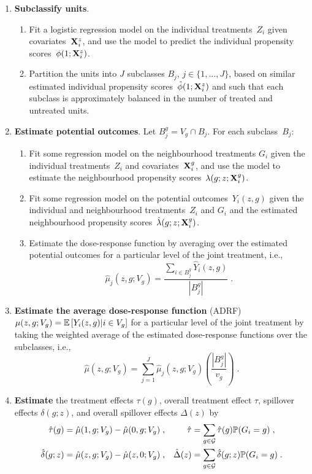 \documentclass[10pt]{article}
\begin{document}
\begin{enumerate}

\item
\textbf{Subclassify units}.
\begin{enumerate}
\item
Fit a logistic regression model on the individual treatments~$Z_i$ given covariates~$\mathbf{X}_i^z$, and use the model to predict the individual propensity scores~$\phi(1;\mathbf{X}_i^z)$.
\item
Partition the units into $J$ subclasses $B_j$, $j\in\{1,\ldots,J\}$, based on similar estimated individual propensity scores~$\hat{\phi}(1;\mathbf{X}_i^z)$ and such that each subclass is approximately balanced in the number of treated and untreated units.
\end{enumerate}

\item
\textbf{Estimate potential outcomes}. Let $B_j^g=	V_g\cap B_j$. For each subclass~$B_j$:
\begin{enumerate}
\item
Fit some regression model on the neighbourhood treatments $G_i$ given the individual treatments~$Z_i$ and covariates~$\mathbf{X}_i^g$, and use the model to estimate the neighbourhood propensity scores~$\lambda(g;z;\mathbf{X}_i^g)$.
\item
Fit some regression model on the potential outcomes~$Y_i(z,g)$ given the individual and neighbourhood treatments~$Z_i$ and $G_i$ and the estimated neighbourhood propensity scores~$\hat{\lambda}(g;z;\mathbf{X}_i^g)$.
\item
Estimate the dose-response function by averaging over the estimated potential outcomes for a particular level of the joint treatment, i.e.,
\[
\hat{\mu}_j(z,g;V_g) = \frac{\sum_{i\in B_j^g}\hat{Y}_i(z,g)}{\left|B_j^g\right|}\;.
\]
\end{enumerate}

\item
\textbf{Estimate the average dose-response function} (ADRF) $\mu(z,g;V_g)=\mathbb{E}\left[Y_i(z,g)|i\in V_g\right]$ for a particular level of the joint treatment by taking the weighted average of the estimated dose-response functions over the subclasses, i.e.,
\[
\hat{\mu}(z,g;V_g) = \sum_{j=1}^J\hat{\mu}_j(z,g;V_g)\left(\frac{\left|B_j^g\right|}{v_g}\right) \;.
\]

\item
\textbf{Estimate} the treatment effects $\tau(g)$, overall treatment effect $\tau$, spillover effects $\delta(g;z)$, and overall spillover effects $\Delta(z)$ by
\begin{align*}
\hat{\tau}(g) &= \hat{\mu}(1,g;V_g) - \hat{\mu}(0,g;V_g) \;, & \hat{\tau}&=\sum_{g\in\mathcal{G}}\hat{\tau}(g)\mathbb{P}(G_i=g) \;, \\
\hat{\delta}(g;z) &= \hat{\mu}(z,g;V_g) - \hat{\mu}(z,0;V_g) \;, & \hat{\Delta}(z) &= \sum_{g\in\mathcal{G}}\hat{\delta}(g;z)\mathbb{P}(G_i=g)\;.
\end{align*}

\end{enumerate}
\end{document}

